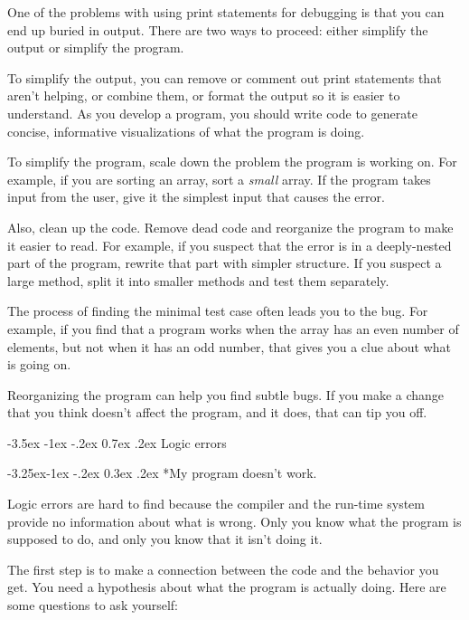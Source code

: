 \documentclass[12pt]{book}
\makeatletter
\theoremstyle{exercise}
\renewcommand{\section}{\@startsection{section}{1}{\z@}%
    {-3.5ex \@plus -1ex \@minus -.2ex}%
    {0.7ex \@plus.2ex}%
    {\normalfont\Large\bfseries}}
\renewcommand\subsection{\@startsection{subsection}{2}{\z@}%
    {-3.25ex\@plus -1ex \@minus -.2ex}%
    {0.3ex \@plus .2ex}%
    {\normalfont\large\bfseries}}
\makeatother
\begin{document}
One of the problems with using print statements for debugging is that you can end up buried in output.
There are two ways to proceed: either simplify the output or simplify the program.

To simplify the output, you can remove or comment out print statements that aren't helping, or combine them, or format the output so it is easier to understand.
As you develop a program, you should write code to generate concise, informative visualizations of what the program is doing.

To simplify the program, scale down the problem the program is working on.  For example, if you are sorting an array, sort a {\em small} array.
If the program takes input from the user, give it the simplest input that causes the error.

Also, clean up the code.
Remove dead code and reorganize the program to make it easier to read.
For example, if you suspect that the error is in a deeply-nested part of the program, rewrite that part with simpler structure.
If you suspect a large method, split it into smaller methods and test them
separately.

The process of finding the minimal test case often leads you to the bug.
For example, if you find that a program works when the array has an even number of elements, but not when it has an odd number, that gives you a clue about what is going on.

Reorganizing the program can help you find subtle bugs.
If you make a change that you think doesn't affect the program, and it does, that can tip you off.


\section{Logic errors}

\subsection*{My program doesn't work.}

Logic errors are hard to find because the compiler and the run-time system provide no information about what is wrong.
Only you know what the program is supposed to do, and only you know that it isn't doing it.

The first step is to make a connection between the code and the behavior you get.
You need a hypothesis about what the program is actually doing.
%
Here are some questions to ask yourself:
\end{document}
